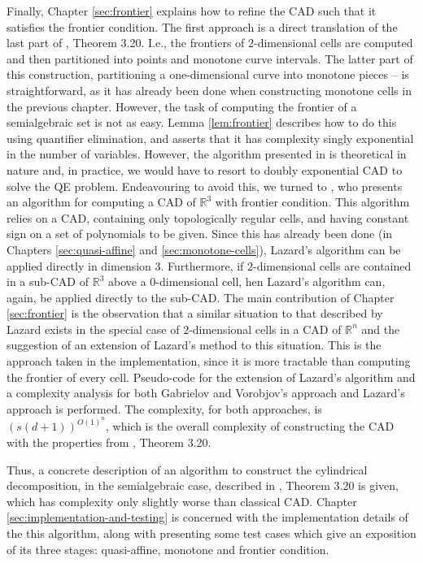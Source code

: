\documentclass[
]{book}
\theoremstyle{definition}
\theoremstyle{definition}
\theoremstyle{definition}
\theoremstyle{definition}
\theoremstyle{remark}
\begin{document}
Finally, Chapter \ref{sec:frontier} explains how to refine the CAD such that it satisfies the frontier condition. The
first approach is a direct translation of the last part of \citet{bgv15}, Theorem 3.20. I.e., the frontiers of \(2\)-dimensional
cells are computed and then partitioned into points and monotone curve intervals. The latter part of this construction,
partitioning a one-dimensional curve into monotone pieces -- is straightforward, as it has already been done when constructing monotone cells in the previous chapter.
However, the task of computing the frontier of a semialgebraic set is not as easy. Lemma \ref{lem:frontier} describes how to do this using quantifier elimination, and asserts that it has complexity singly exponential in the number of variables. However, the algorithm presented in \citep[Algorithm 14.21]{bpr2006} is theoretical in nature and, in practice, we would have to resort to doubly exponential CAD to solve the QE problem.
Endeavouring to avoid this, we turned to \citet{lazard10}, who presents an algorithm for computing a CAD of \(\mathbb{R}^3\) with frontier condition. This algorithm relies on a CAD, containing only topologically regular cells, and having constant sign on a set of polynomials to be given. Since this has already been done (in Chapters \ref{sec:quasi-affine} and \ref{sec:monotone-cells}), Lazard's algorithm can be applied directly in dimension \(3\). Furthermore, if \(2\)-dimensional cells are contained in a sub-CAD of \(\mathbb{R}^3\) above a \(0\)-dimensional cell, hen Lazard's algorithm can, again, be applied directly to the sub-CAD.
The main contribution of Chapter \ref{sec:frontier} is the observation that a similar situation to that described by Lazard exists in the special case of \(2\)-dimensional cells in a CAD of \(\mathbb{R}^n\) and the suggestion of an extension of Lazard's method to this situation.
This is the approach taken in the implementation, since it is more tractable than computing the frontier of every cell.
Pseudo-code for the extension of Lazard's algorithm and a complexity analysis for both Gabrielov and Vorobjov's approach and Lazard's approach is performed. The complexity, for both approaches, is \(\left(s (d+1)\right)^{O(1)^{n}}\), which is the overall complexity of constructing the CAD with the properties from \citet{bgv15}, Theorem 3.20.

Thus, a concrete description of an algorithm to construct the cylindrical decomposition, in the semialgebraic case, described in \citet{bgv15}, Theorem 3.20 is given, which has complexity only slightly worse than classical CAD.
Chapter \ref{sec:implementation-and-testing} is concerned with the implementation details of the this algorithm, along with presenting some test cases which give an exposition of its three stages: quasi-affine, monotone and frontier condition.
\end{document}
